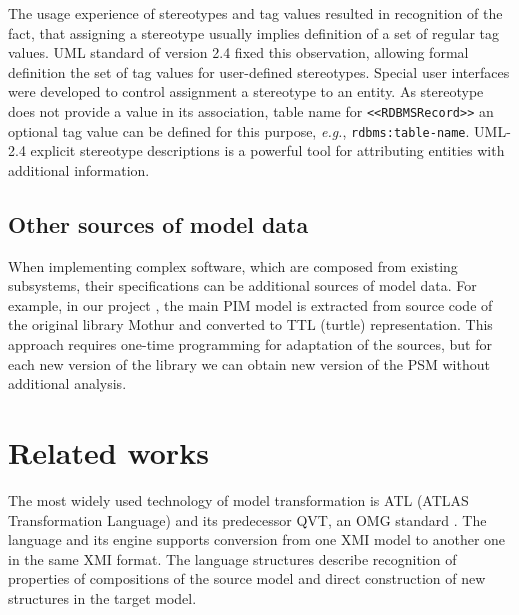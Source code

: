 \documentclass[conference]{IEEEtran} \IEEEoverridecommandlockouts
\begin{document}
The usage experience of stereotypes and tag values resulted in recognition of the fact, that assigning a stereotype usually implies definition of a set of regular tag values. UML standard of version 2.4 fixed this observation, allowing formal definition the set of tag values for user-defined stereotypes. Special user interfaces were developed to control assignment a stereotype to an entity. As stereotype does not provide a value in its association, table name for \texttt{<<RDBMSRecord>>} an optional tag value can be defined for this purpose, \emph{e.g.}, \texttt{rdbms:table-name}. UML-2.4 explicit stereotype descriptions is a powerful tool for attributing entities with additional information. 

\subsection{Other sources of model data} \label{sec:other-models} 

When implementing complex software, which are composed from existing subsystems, their specifications can be additional sources of model data. For example, in our project \cite{bit2019}, the main PIM model is extracted from source code of the original library Mothur and converted to TTL (turtle) representation. This approach requires one-time programming for adaptation of the sources, but for each new version of the library we can obtain new version of the PSM without additional analysis. 

\section{Related works} 

The most widely used technology of model transformation is ATL (ATLAS Transformation Language) \cite{atl} and its predecessor QVT, an OMG standard \cite{QVT}. The language and its engine supports conversion from one XMI model to another one in the same XMI format. The language structures describe recognition of properties of compositions of the source model and direct construction of new structures in the target model. 
\end{document}
